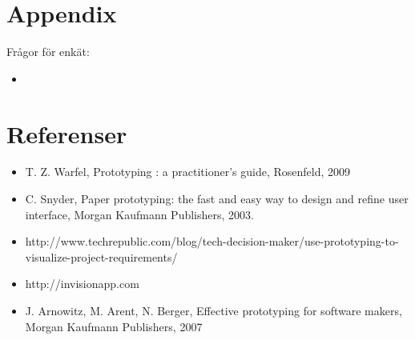 \documentclass{article}
\begin{document}
\section{Appendix}
Frågor för enkät:
\begin{itemize}
	\item 
\end{itemize}


\clearpage
\section{Referenser}
\begin{itemize}
	\item T. Z. Warfel, Prototyping : a practitioner's guide, Rosenfeld, 2009
	\item C. Snyder, Paper prototyping: the fast and easy way to design and refine user interface, Morgan Kaufmann Publishers, 2003.
	\item http://www.techrepublic.com/blog/tech-decision-maker/use-prototyping-to-visualize-project-requirements/
	\item http://invisionapp.com
	\item J. Arnowitz, M. Arent, N. Berger, Effective prototyping for software makers, Morgan Kaufmann Publishers, 2007
\end{itemize}

\nocite{*}
{}

\end{document}
